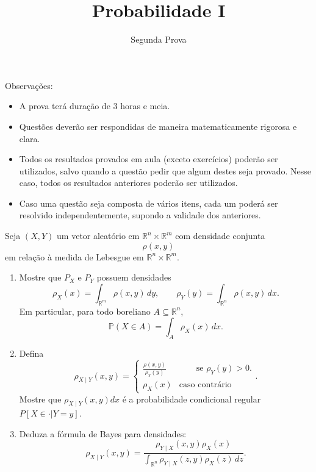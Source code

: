 \documentclass{article}
\newcommand*\1{\mathds{1}}
\begin{document}
\title{Probabilidade I}
\author{Segunda Prova}

\maketitle

\noindent Observa\c{c}\~oes:
\begin{itemize}
\item A prova terá duração de $3$ horas e meia.
\item Questões deverão ser respondidas de maneira matematicamente rigorosa e clara.
\item Todos os resultados provados em aula (exceto exercícios) poderão ser utilizados, salvo quando a questão pedir que algum destes seja provado. Nesse caso, todos os resultados anteriores poderão ser utilizados.
\item Caso uma questão seja composta de vários itens, cada um poderá ser resolvido independentemente, supondo a validade dos anteriores.
\end{itemize}

\vspace{4mm}
Seja $(X,Y)$ um vetor aleatório em $\mathbb R^n\times\mathbb R^m$ com densidade conjunta
\begin{equation}
    \rho(x,y)
\end{equation}
em relação à medida de Lebesgue em $\mathbb R^n\times\mathbb R^m$.

\begin{enumerate}[\quad a)]
\item Mostre que $P_X$ e $P_Y$ possuem densidades
\begin{equation}
  \rho_X(x)=\int_{\mathbb R^m}\rho(x,y)\,dy,
  \qquad
  \rho_Y(y)=\int_{\mathbb R^n}\rho(x,y)\,dx.
\end{equation}
Em particular, para todo boreliano $A\subseteq \mathbb R^n$,
  \begin{equation}
    \mathbb P(X\in A) = \int_A \rho_X(x)\,dx.
  \end{equation}
\item Defina
  \begin{equation}
    \rho_{X \mid Y}(x, y)
    = \begin{cases}
        \frac{\rho(x,y)}{\rho_Y(y)} & \qquad \text{se $\rho_Y(y) > 0$.}\\
        \rho_X(x) & \text{caso contrário}
      \end{cases}.
    \end{equation}
Mostre que $\rho_{X \mid Y}(x, y) dx$ é a probabilidade condicional regular $P[X \in \cdot | Y = y]$.

    \item Deduza a fórmula de Bayes para densidades:
    \begin{equation}
    \rho_{X \mid Y}(x, y)
    =
    \frac{\rho_{Y \mid X}(x, y)\rho_X(x)}
    {\int_{\mathbb R^n}\rho_{Y\mid X}(z, y)\rho_X(z) \, dz}.
    \end{equation}
\end{enumerate}
\end{document}
